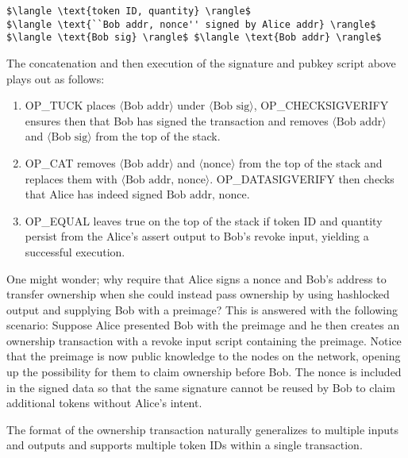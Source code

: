 \documentclass[9pt,oneside]{amsart}
\begin{document}
\begin{multicols}{2}
\begin{lstlisting}[title={\textbf{Bob's Revoke Signature Script}}]
$\langle \text{token ID, quantity} \rangle$ 
$\langle \text{``Bob addr, nonce'' signed by Alice addr} \rangle$ $\langle \text{Bob sig} \rangle$ $\langle \text{Bob addr} \rangle$ 
\end{lstlisting}

The concatenation and then execution of the signature and pubkey script above plays out as follows:
\begin{enumerate}
    \item OP\_TUCK places $\langle \text{Bob addr} \rangle$ under $\langle \text{Bob sig} \rangle$, OP\_CHECKSIGVERIFY ensures then that Bob has signed the transaction and removes $\langle \text{Bob addr} \rangle$ and $\langle \text{Bob sig} \rangle$ from the top of the stack.
    \item OP\_CAT removes $\langle \text{Bob addr} \rangle$ and $\langle \text{nonce} \rangle$ from the top of the stack and replaces them with $\langle \text{Bob addr, nonce} \rangle$. OP\_DATASIGVERIFY then checks that Alice has indeed signed $\text{Bob addr, nonce}$.
    \item OP\_EQUAL leaves true on the top of the stack if token ID and quantity persist from the Alice's assert output to Bob's revoke input, yielding a successful execution.
\end{enumerate}


One might wonder; why require that Alice signs a nonce and Bob's address to transfer ownership when she could instead pass ownership by using hashlocked output and supplying Bob with a preimage? This is answered with the following scenario: Suppose Alice presented Bob with the preimage and he then creates an ownership transaction with a revoke input script containing the preimage. Notice that the preimage is now public knowledge to the nodes on the network, opening up the possibility for them to claim ownership before Bob. The nonce is included in the signed data so that the same signature cannot be reused by Bob to claim additional tokens without Alice's intent.

The format of the ownership transaction naturally generalizes to multiple inputs and outputs and supports multiple token IDs within a single transaction.


\end{multicols}
\end{document}
